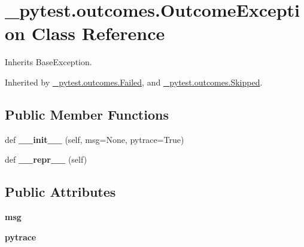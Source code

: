 \hypertarget{class__pytest_1_1outcomes_1_1_outcome_exception}{}\section{\+\_\+pytest.\+outcomes.\+Outcome\+Exception Class Reference}
\label{class__pytest_1_1outcomes_1_1_outcome_exception}


Inherits Base\+Exception.



Inherited by \hyperlink{class__pytest_1_1outcomes_1_1_failed}{\+\_\+pytest.\+outcomes.\+Failed}, and \hyperlink{class__pytest_1_1outcomes_1_1_skipped}{\+\_\+pytest.\+outcomes.\+Skipped}.

\subsection*{Public Member Functions}
\begin{DoxyCompactItemize}
\item 
\mbox{\label{class__pytest_1_1outcomes_1_1_outcome_exception_ae4210d64e51aa77e5dec01e557b11f27}} 
def {\bfseries \+\_\+\+\_\+init\+\_\+\+\_\+} (self, msg=None, pytrace=True)
\item 
\mbox{\label{class__pytest_1_1outcomes_1_1_outcome_exception_a64c5976ab6ce6067c03a749c455f3da3}} 
def {\bfseries \+\_\+\+\_\+repr\+\_\+\+\_\+} (self)
\end{DoxyCompactItemize}
\subsection*{Public Attributes}
\begin{DoxyCompactItemize}
\item 
\mbox{\label{class__pytest_1_1outcomes_1_1_outcome_exception_aaebb96cefc38b075f32329af2fb47cf6}} 
{\bfseries msg}
\item 
\mbox{\label{class__pytest_1_1outcomes_1_1_outcome_exception_a72e421067e4026e1495b97765db5ee83}} 
{\bfseries pytrace}
\end{DoxyCompactItemize}


